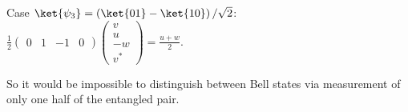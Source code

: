 \par Case $\ket{\psi_3} = \left( \ket{01} - \ket{10} \right) / \sqrt{2}$:
$\frac{1}{2} \begin{pmatrix} 0 & 1 & -1 & 0 \end{pmatrix} \begin{pmatrix} v \\ u
\\ -w \\ v^* \end{pmatrix} = \frac{u + w}{2}$.

\par So it would be impossible to distinguish between Bell states via
measurement of only one half of the entangled pair.
